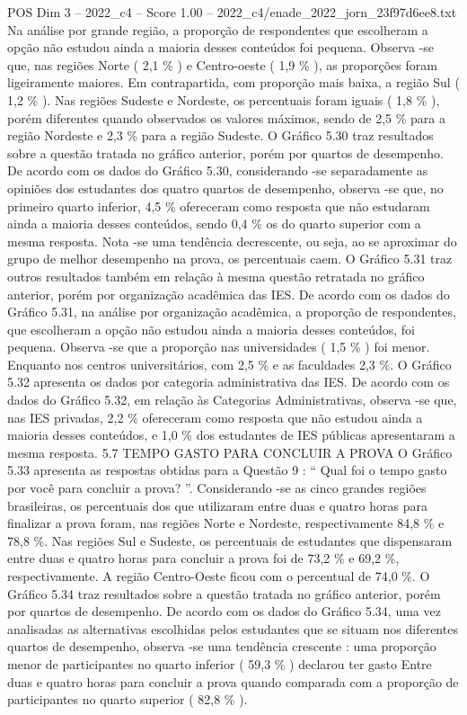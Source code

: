 \begin{textsample}{POS Dim 3 – 2022\_c4 – Score 1.00 – 2022\_c4/enade\_2022\_jorn\_23f97d6ee8.txt}
Na análise por grande região, a proporção de respondentes que escolheram a opção não estudou ainda a maioria desses conteúdos foi pequena.
Observa -se que, nas regiões Norte ( 2,1 \% ) e Centro-oeste ( 1,9 \% ), as proporções foram ligeiramente maiores.
Em contrapartida, com proporção mais baixa, a região Sul ( 1,2 \% ).
Nas regiões Sudeste e Nordeste, os percentuais foram iguais ( 1,8 \% ), porém diferentes quando observados os valores máximos, sendo de 2,5 \% para a região Nordeste e 2,3 \% para a região Sudeste.
O Gráfico 5.30 traz resultados sobre a questão tratada no gráfico anterior, porém por quartos de desempenho.
De acordo com os dados do Gráfico 5.30, considerando -se separadamente as opiniões dos estudantes dos quatro quartos de desempenho, observa -se que, no primeiro quarto inferior, 4,5 \% ofereceram como resposta que não estudaram ainda a maioria desses conteúdos, sendo 0,4 \% os do quarto superior com a mesma resposta.
Nota -se uma tendência decrescente, ou seja, ao se aproximar do grupo de melhor desempenho na prova, os percentuais caem.
O Gráfico 5.31 traz outros resultados também em relação à mesma questão retratada no gráfico anterior, porém por organização acadêmica das IES.
De acordo com os dados do Gráfico 5.31, na análise por organização acadêmica, a proporção de respondentes, que escolheram a opção não estudou ainda a maioria desses conteúdos, foi pequena.
Observa -se que a proporção nas universidades ( 1,5 \% ) foi menor.
Enquanto nos centros universitários, com 2,5 \% e as faculdades 2,3 \%.
O Gráfico 5.32 apresenta os dados por categoria administrativa das IES.
De acordo com os dados do Gráfico 5.32, em relação às Categorias Administrativas, observa -se que, nas IES privadas, 2,2 \% ofereceram como resposta que não estudou ainda a maioria desses conteúdos, e 1,0 \% dos estudantes de IES públicas apresentaram a mesma resposta. 5.7 TEMPO GASTO PARA CONCLUIR A PROVA O Gráfico 5.33 apresenta as respostas obtidas para a Questão 9 : “ Qual foi o tempo gasto por você para concluir a prova? ”.
Considerando -se as cinco grandes regiões brasileiras, os percentuais dos que utilizaram entre duas e quatro horas para finalizar a prova foram, nas regiões Norte e Nordeste, respectivamente 84,8 \% e 78,8 \%.
Nas regiões Sul e Sudeste, os percentuais de estudantes que dispensaram entre duas e quatro horas para concluir a prova foi de 73,2 \% e 69,2 \%, respectivamente.
A região Centro-Oeste ficou com o percentual de 74,0 \%.
O Gráfico 5.34 traz resultados sobre a questão tratada no gráfico anterior, porém por quartos de desempenho.
De acordo com os dados do Gráfico 5.34, uma vez analisadas as alternativas escolhidas pelos estudantes que se situam nos diferentes quartos de desempenho, observa -se uma tendência crescente : uma proporção menor de participantes no quarto inferior ( 59,3 \% ) declarou ter gasto Entre duas e quatro horas para concluir a prova quando comparada com a proporção de participantes no quarto superior ( 82,8 \% ).

\end{textsample}
